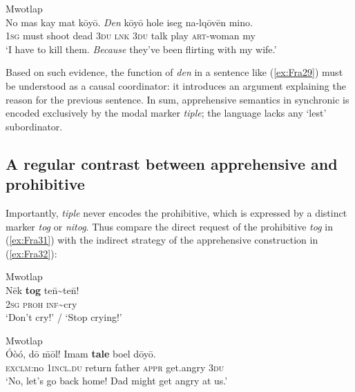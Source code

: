 \documentclass[output=paper,colorlinks,citecolor=brown]{langscibook}
\begin{document}
\ea \label{ex:Fra30} \textnormal{Mwotlap}  \\
\gll No mas kay mat kōyō. \textit{Den} kōyō hole iseg na-lqōvēn mino. \\
\textsc{1sg} must shoot dead \textsc{3du} \textsc{lnk} \textsc{3du} talk play \textsc{art}-woman my \\
\glt `I have to kill them. \textit{Because} they've been flirting with my wife.' 
\z

 Based on such evidence, the function of \textit{den} in a sentence like (\ref{ex:Fra29}) must be understood as a causal coordinator: it introduces an argument explaining the reason for the previous sentence. In sum, apprehensive semantics in synchronic  is encoded exclusively by the modal marker \textit{tiple}; the language lacks any `lest' subordinator.





\subsection{A regular contrast between apprehensive and prohibitive}
\label{subsec:contrast}

Importantly,  \textit{tiple} never encodes the prohibitive, which is expressed by a distinct marker \textit{tog} or \textit{nitog}. Thus compare the direct request of the prohibitive \textit{tog} in (\ref{ex:Fra31}) with the indirect strategy of the apprehensive construction in (\ref{ex:Fra32}):
 

\ea \label{ex:Fra31} \textnormal{Mwotlap}  \\
\gll Nēk \textbf{tog} te\={n}\textasciitilde te\={n}! \\
\textsc{2sg} \textsc{proh} \textsc{inf}\textasciitilde cry \\
\glt `Don't cry!' / `Stop crying!' 
\z

\ea \label{ex:Fra32} \textnormal{Mwotlap}  \\
\gll Óòó, dō \={m}ōl! Imam \textbf{tale} boel dōyō. \\
\textsc{exclm}:no \textsc{1incl.du} return father \textsc{appr} get.angry \textsc{3du} \\
\glt `No, let's go back home! Dad might get angry at us.' 
\z
\end{document}
